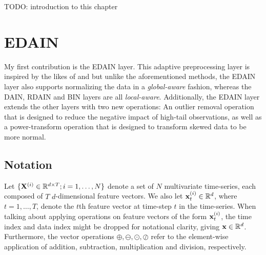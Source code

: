 \documentclass{statsmsc}
\begin{document}
TODO: introduction to this chapter

\section{EDAIN}%
\label{sec:EDAIN-method}



My first contribution is the \ac{EDAIN} layer. This adaptive preprocessing layer is inspired
by the likes of \citep{dain}  and \citep{bin} but unlike the aforementioned methods, the
\ac{EDAIN} layer also supports normalizing the data in a \textit{global-aware} fashion, whereas
the \ac{DAIN}, \ac{RDAIN} and \ac{BIN} layers are all \textit{local-aware}.
Additionally, the \ac{EDAIN} layer extends the other layers with two new operations: An outlier
removal operation that is designed to reduce the negative impact of high-tail observations,
as well as a power-transform operation that is designed to transform skewed data to be more
normal.

\subsection{Notation}%
\label{sub:Notation}


Let $\{\mathbf{X}^{(i)} \in \mathbb{R}^{d \times T};i=1,\dots,N\}$ denote a set of $N$ multivariate time-series,
each composed of $T$ $d$-dimensional feature vectors. We also let $\mathbf{x}_t^{(i)}\in \mathbb{R}^d$,
where $t=1,\dots,T$, denote the $t$th feature vector at time-step $t$ in the time-series.
When talking about applying operations on feature vectors of the form $\mathbf{x}_t^{(i)}$, the time index and data index might
be dropped for notational clarity, giving $\mathbf{x} \in \mathbb{R}^d$. Furthermore, the vector operations
$\oplus, \ominus, \odot, \oslash$ refer to the element-wise
application of addition, subtraction, multiplication and division, respectively.
\end{document}
